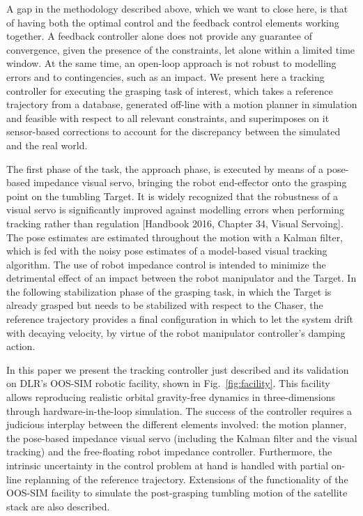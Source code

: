 A gap in the methodology described above, which we want to close here, is that of having both the optimal control and the feedback control elements working together. A feedback controller alone does not provide any guarantee of convergence, given the presence of the constraints, let alone within a limited time window. At the same time, an open-loop approach is not robust to modelling errors and to contingencies, such as an impact. We present here a tracking controller for executing the grasping task of interest, which takes a reference trajectory from a database, generated off-line with a motion planner in simulation and feasible with respect to all relevant constraints, and superimposes on it sensor-based corrections to account for the discrepancy between the simulated and the real world.

The first phase of the task, the approach phase, is executed by means of a pose-based impedance visual servo, bringing the robot end-effector onto the grasping point on the tumbling Target. It is widely recognized that the robustness of a visual servo is significantly improved against modelling errors when performing tracking rather than regulation [Handbook 2016, Chapter 34, Visual Servoing]. The pose estimates are estimated throughout the motion with a Kalman filter, which is fed with the noisy pose estimates of a model-based visual tracking algorithm. The use of robot impedance control is intended to minimize the detrimental effect of an impact between the robot manipulator and the Target. In the following stabilization phase of the grasping task, in which the Target is already grasped but needs to be stabilized with respect to the Chaser, the reference trajectory provides a final configuration in which to let the system drift with decaying velocity, by virtue of the robot manipulator controller's damping action.

In this paper we present the tracking controller just described and its validation on DLR's OOS-SIM robotic facility, shown in Fig.~\ref{fig:facility}. This facility allows reproducing realistic orbital gravity-free dynamics in three-dimensions through hardware-in-the-loop simulation. The success of the controller requires a judicious interplay between the different elements involved: the motion planner, the pose-based impedance visual servo (including the Kalman filter and the visual tracking) and the free-floating robot impedance controller. Furthermore, the intrinsic uncertainty in the control problem at hand is handled with partial on-line replanning of the reference trajectory. Extensions of the functionality of the OOS-SIM facility to simulate the post-grasping tumbling motion of the satellite stack are also described.

